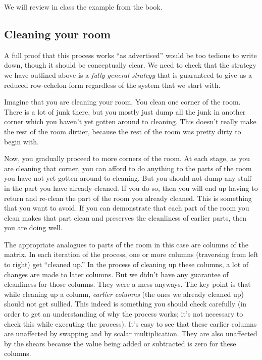 \documentclass[10pt]{amsart}
\begin{document}
We will review in class the example from the book.

\subsection{Cleaning your room}

A full proof that this process works ``as advertised'' would be too
tedious to write down, though it should be conceptually clear. We need
to check that the strategy we have outlined above is a {\em fully
  general strategy} that is guaranteed to give us a reduced
row-echelon form regardless of the system that we start with.

Imagine that you are cleaning your room. You clean one corner of the
room. There is a lot of junk there, but you mostly just dump all the
junk in another corner which you haven't yet gotten around to
cleaning. This doesn't really make the rest of the room dirtier,
because the rest of the room was pretty dirty to begin with.

Now, you gradually proceed to more corners of the room. At each stage,
as you are cleaning that corner, you can afford to do anything to the
parts of the room you have not yet gotten around to cleaning. But you
should not dump any stuff in the part you have already cleaned. If you
do so, then you will end up having to return and re-clean the part of
the room you already cleaned. This is something that you want to
avoid. If you can demonstrate that each part of the room you clean
makes that part clean and preserves the cleanliness of earlier parts,
then you are doing well.

The appropriate analogues to parts of the room in this case are
columns of the matrix. In each iteration of the process, one or more
columns (traversing from left to right) get ``cleaned up.'' In the
process of cleaning up these columns, a lot of changes are made to
later columns. But we didn't have any guarantee of cleanliness for
those columns. They were a mess anyways. The key point is that while
cleaning up a column, {\em earlier columns} (the ones we already
cleaned up) should not get sullied. This indeed is something you
should check carefully (in order to get an understanding of why the
process works; it's not necessary to check this while executing the
process). It's easy to see that these earlier columns are unaffected
by swapping and by scalar multiplication. They are also unaffected by
the shears because the value being added or subtracted is zero for
these columns.
\end{document}
